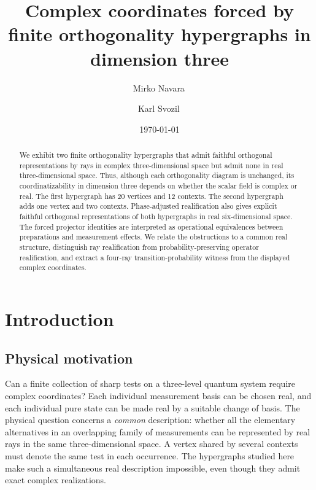 \documentclass[twocolumn,aps,pra,floatfix,amsmath,amssymb,longbibliography]{revtex4-2}
\theoremstyle{definition}
\theoremstyle{remark}
\begin{document}
\title{Complex coordinates forced by finite orthogonality hypergraphs in dimension three}

\author{Mirko Navara\,}

\author{Karl Svozil\,}

\date{\today}

\begin{abstract}
We exhibit two finite orthogonality hypergraphs that admit faithful orthogonal representations by rays in complex three-dimensional space but admit none in real three-dimensional space. Thus, although each orthogonality diagram is unchanged, its coordinatizability in dimension three depends on whether the scalar field is complex or real. The first hypergraph has 20 vertices and 12 contexts. The second hypergraph adds one vertex and two contexts. Phase-adjusted realification also gives explicit faithful orthogonal representations of both hypergraphs in real six-dimensional space. The forced projector identities are interpreted as operational equivalences between preparations and measurement effects. We relate the obstructions to a common real structure, distinguish ray realification from probability-preserving operator realification, and extract a four-ray transition-probability witness from the displayed complex coordinates.
\end{abstract}

\maketitle

\section{Introduction}

\subsection{Physical motivation}

Can a finite collection of sharp tests on a three-level quantum system
require complex coordinates?  Each individual measurement basis can be
chosen real, and each individual pure state can be made real by a suitable
change of basis.  The physical question concerns a \emph{common} description:
whether all the elementary alternatives in an overlapping family of
measurements can be represented by real rays in the same three-dimensional
space.  A vertex shared by several contexts must denote the same test in
each occurrence.  The hypergraphs studied here make such a simultaneous
real description impossible, even though they admit exact complex
realizations.
\end{document}
